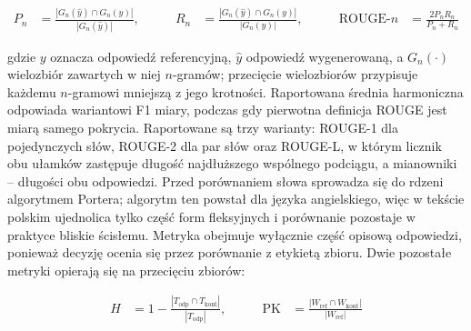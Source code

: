 \begin{equation}
\begin{aligned}
P_n &= \frac{|G_n(\hat{y}) \cap G_n(y)|}{|G_n(\hat{y})|},
&\qquad
R_n &= \frac{|G_n(\hat{y}) \cap G_n(y)|}{|G_n(y)|},
&\qquad
\text{ROUGE-}n &= \frac{2 P_n R_n}{P_n + R_n}
\end{aligned}
\label{eq:rouge}
\end{equation}

gdzie $y$ oznacza odpowiedź referencyjną, $\hat{y}$ odpowiedź wygenerowaną, a $G_n(\cdot)$
wielozbiór zawartych w niej $n$-gramów; przecięcie wielozbiorów przypisuje każdemu $n$-gramowi
mniejszą z jego krotności. Raportowana średnia harmoniczna odpowiada wariantowi F1 miary,
podczas gdy pierwotna definicja ROUGE jest miarą samego pokrycia.
Raportowane są trzy warianty: ROUGE-1 dla pojedynczych słów, ROUGE-2
dla par słów oraz ROUGE-L, w którym licznik obu ułamków zastępuje długość najdłuższego wspólnego
podciągu, a mianowniki -- długości obu odpowiedzi. Przed porównaniem słowa sprowadza się do
rdzeni algorytmem Portera; algorytm ten powstał dla języka angielskiego, więc w tekście polskim
ujednolica tylko część form fleksyjnych i porównanie pozostaje w praktyce bliskie ścisłemu. Metryka obejmuje
wyłącznie część opisową odpowiedzi, ponieważ decyzję ocenia się przez porównanie z etykietą zbioru. Dwie pozostałe metryki opierają się na przecięciu zbiorów:

\begin{equation}
\begin{aligned}
H &= 1 - \frac{|T_\mathrm{odp} \cap T_\mathrm{kont}|}{|T_\mathrm{odp}|},
&\qquad
\mathrm{PK} &= \frac{|W_\mathrm{ref} \cap W_\mathrm{kont}|}{|W_\mathrm{ref}|}
\end{aligned}
\label{eq:metrykiRAG}
\end{equation}

